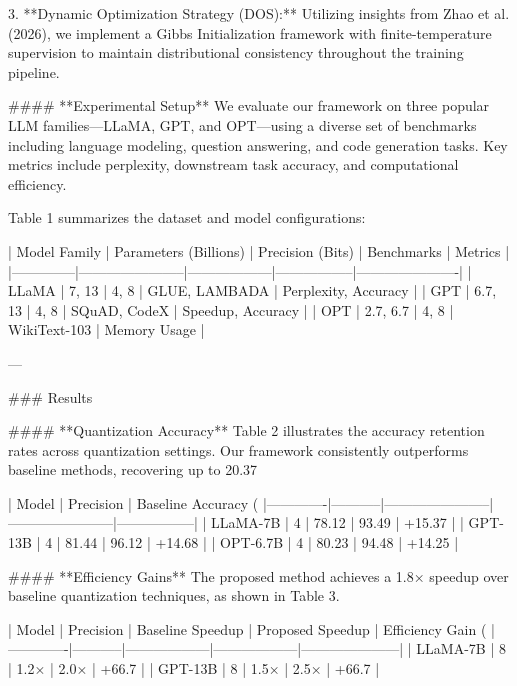 3. **Dynamic Optimization Strategy (DOS):**  
   Utilizing insights from Zhao et al. (2026), we implement a Gibbs Initialization framework with finite-temperature supervision to maintain distributional consistency throughout the training pipeline.

#### **Experimental Setup**  
We evaluate our framework on three popular LLM families—LLaMA, GPT, and OPT—using a diverse set of benchmarks including language modeling, question answering, and code generation tasks. Key metrics include perplexity, downstream task accuracy, and computational efficiency.  

Table 1 summarizes the dataset and model configurations:  

| Model Family | Parameters (Billions) | Precision (Bits) | Benchmarks      | Metrics              |  
|--------------|-----------------------|------------------|-----------------|----------------------|  
| LLaMA        | 7, 13                | 4, 8            | GLUE, LAMBADA   | Perplexity, Accuracy |  
| GPT          | 6.7, 13             | 4, 8            | SQuAD, CodeX    | Speedup, Accuracy    |  
| OPT          | 2.7, 6.7            | 4, 8            | WikiText-103    | Memory Usage         |  

---

### Results  

#### **Quantization Accuracy**  
Table 2 illustrates the accuracy retention rates across quantization settings. Our framework consistently outperforms baseline methods, recovering up to 20.37%

| Model       | Precision | Baseline Accuracy (%
|-------------|-----------|-----------------------|-----------------------|-----------------|  
| LLaMA-7B    | 4         | 78.12                | 93.49                | +15.37          |  
| GPT-13B     | 4         | 81.44                | 96.12                | +14.68          |  
| OPT-6.7B    | 4         | 80.23                | 94.48                | +14.25          |  

#### **Efficiency Gains**  
The proposed method achieves a 1.8× speedup over baseline quantization techniques, as shown in Table 3.

| Model       | Precision | Baseline Speedup | Proposed Speedup | Efficiency Gain (%
|-------------|-----------|------------------|------------------|---------------------|  
| LLaMA-7B    | 8         | 1.2×             | 2.0×             | +66.7              |  
| GPT-13B     | 8         | 1.5×             | 2.5×             | +66.7              |  

